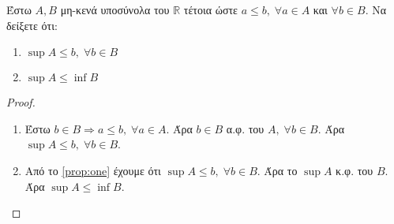 \begin{multicols}{2}
\begin{enumerate}
    \item \textcolor{Col1}{Έστω $ A, B $ μη-κενά υποσύνολα του $ \mathbb{R} $ 
        τέτοια ώστε $ a \leq b, \; \forall a \in A $ και $ \forall b \in B $.
        Να δείξετε ότι:
        \begin{enumerate}
          \item $ \sup A \leq b, \;  \forall b \in B $
          \item $ \sup A \leq \inf B $
      \end{enumerate}}
      \begin{proof}
      \item {}
        \begin{enumerate}
          \item \label{prop:one} Έστω $ b \in B \Rightarrow a \leq b, \; 
            \forall a \in A $. 
            Άρα $ b \in B $ α.φ. του $A, \; \forall b \in B$. Άρα 
            $ \sup A \leq b, \; \forall b \in B $.
          \item Από το \ref{prop:one} έχουμε ότι $ \sup A \leq b, \; \forall 
            b \in B$. Άρα το $ \sup A $ κ.φ. του $B$. Άρα $ \sup A \leq 
            \inf B$.
        \end{enumerate}
      \end{proof}


\end{enumerate}
\end{multicols}
